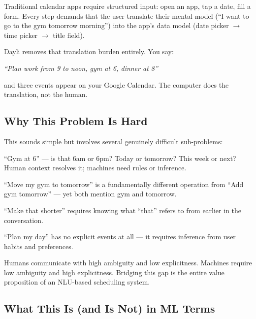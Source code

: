 \documentclass[12pt, a4paper]{article}
\begin{document}
Traditional calendar apps require structured input: open an app, tap a date, fill a form. Every step demands that the user translate their mental model (``I want to go to the gym tomorrow morning'') into the app's data model (date picker $\to$ time picker $\to$ title field).

Dayli removes that translation burden entirely. You say:

\begin{center}
\itshape ``Plan work from 9 to noon, gym at 6, dinner at 8''
\end{center}

\noindent and three events appear on your Google Calendar. The computer does the translation, not the human.

\subsection{Why This Problem Is Hard}

This sounds simple but involves several genuinely difficult sub-problems:

\begin{description}[leftmargin=1em, style=nextline]
  \item[Temporal ambiguity] ``Gym at 6'' --- is that 6am or 6pm? Today or tomorrow? This week or next? Human context resolves it; machines need rules or inference.
  \item[Intent multiplicity] ``Move my gym to tomorrow'' is a fundamentally different operation from ``Add gym tomorrow'' --- yet both mention gym and tomorrow.
  \item[Entity co-reference] ``Make that shorter'' requires knowing what ``that'' refers to from earlier in the conversation.
  \item[Implicit structure] ``Plan my day'' has no explicit events at all --- it requires inference from user habits and preferences.
\end{description}

\begin{keybox}
  Humans communicate with high ambiguity and low explicitness. Machines require low ambiguity and high explicitness. Bridging this gap is the entire value proposition of an NLU-based scheduling system.
\end{keybox}

\subsection{What This Is (and Is Not) in ML Terms}
\end{document}
